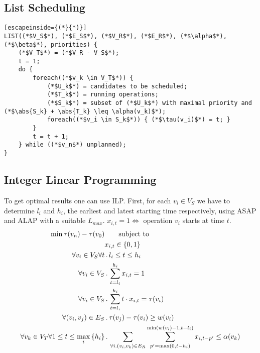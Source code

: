 \subsection{List Scheduling}
\begin{lstlisting}[escapeinside={(*}{*)}]
LIST((*$V_S$*), (*$E_S$*), (*$V_R$*), (*$E_R$*), (*$\alpha$*), (*$\beta$*), priorities) {
	(*$V_T$*) = (*$V_R - V_S$*);
	t = 1;
	do {
		foreach((*$v_k \in V_T$*)) {
			(*$U_k$*) = candidates to be scheduled;
			(*$T_k$*) = running operations;
			(*$S_k$*) = subset of (*$U_k$*) with maximal priority and (*$\abs{S_k} + \abs{T_k} \leq \alpha(v_k)$*);
			foreach((*$v_i \in S_k$*)) { (*$\tau(v_i)$*) = t; }
		}
		t = t + 1;
	} while ((*$v_n$*) unplanned);
}
\end{lstlisting}

\subsection{Integer Linear Programming}
To get optimal results one can use ILP. First, for each $v_i \in V_S$ we have
to determine $l_i$ and $h_i$, the earliest and latest starting time
respectively, using ASAP and ALAP with a suitable $L_{max}$. $x_{i,t} = 1 \iff$
operation $v_i$ starts at time $t$.
\begin{align*}
	\min \tau(v_n) - \tau(v_0) &\qquad \text{subject to} \\
	&x_{i,t} \in \left\lbrace 0, 1 \right\rbrace \\
	\forall v_i \in V_S \forall t &\,.\, l_i \leq t \leq h_i \\
	\forall v_i \in V_S &\,.\, \sum_{t = l_i}^{h_i} x_{i,t} = 1 \\
	\forall v_i \in V_S &\,.\, \sum_{t = l_i}^{h_i} t \cdot x_{i,t} = \tau(v_i) \\
	\forall (v_i, v_j) \in E_S &\,.\, \tau(v_j) - \tau(v_i) \geq w(v_i) \\
	\forall v_k \in V_T \forall 1 \leq t \leq \max_i\left\lbrace h_i \right\rbrace &\,.\, \sum_{\forall i. (v_i, v_k) \in E_R} \sum_{p' = \max(0, t - h_i)}^{\min(w(v_i) - 1, t - l_i)} x_{i, t - p'} \leq \alpha(v_k)
\end{align*}
